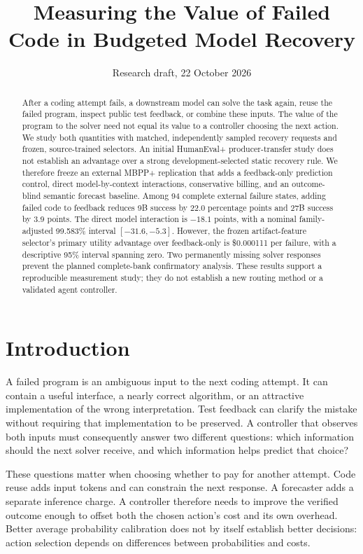 \documentclass[10pt,twocolumn]{article}
\title{Measuring the Value of Failed Code in Budgeted Model Recovery}
\author{}
\date{Research draft, 22 October 2026}
\begin{document}
\maketitle
\begin{abstract}
After a coding attempt fails, a downstream model can solve the task again,
reuse the failed program, inspect public test feedback, or combine these inputs.
The value of the program to the solver need not equal its value to a controller
choosing the next action. We study both quantities with matched, independently
sampled recovery requests and frozen, source-trained selectors. An initial
HumanEval+ producer-transfer study does not establish an advantage over a strong
development-selected static recovery rule. We therefore freeze an external
MBPP+ replication that adds a feedback-only prediction control, direct
model-by-context interactions, conservative billing, and an outcome-blind
semantic forecast baseline. Among 94 complete external failure states, adding
failed code to feedback reduces 9B success by 22.0 percentage points and 27B
success by 3.9 points. The direct model interaction is $-18.1$ points, with a
nominal family-adjusted 99.583\% interval $[-31.6,-5.3]$. However, the frozen
artifact-feature selector's primary utility advantage over feedback-only is
\$0.000111 per failure, with a descriptive 95\% interval spanning zero.
Two permanently missing solver responses prevent the planned complete-bank
confirmatory analysis. These results support a reproducible measurement study;
they do not establish a new routing method or a validated agent controller.
\end{abstract}

\section{Introduction}

A failed program is an ambiguous input to the next coding attempt. It can
contain a useful interface, a nearly correct algorithm, or an attractive
implementation of the wrong interpretation. Test feedback can clarify the
mistake without requiring that implementation to be preserved. A controller
that observes both inputs must consequently answer two different questions:
which information should the next solver receive, and which information helps
predict that choice?

These questions matter when choosing whether to pay for another attempt.
Code reuse adds input tokens and can constrain the next response. A forecaster
adds a separate inference charge. A controller therefore needs to improve the
verified outcome enough to offset both the chosen action's cost and its own
overhead. Better average probability calibration does not by itself establish
better decisions: action selection depends on differences between probabilities
and costs.
\end{document}
